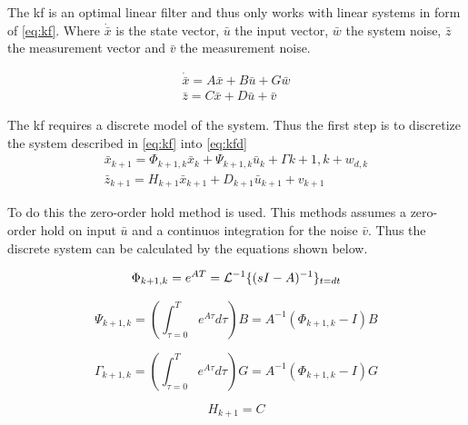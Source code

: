 The \gls{kf} is an optimal linear filter and thus only works with linear systems in form of \autoref{eq:kf}. Where $\dot{\bar x}$ is the state vector, $\bar u $ the input vector, $\bar w$ the system noise, $\bar z$ the measurement vector and $\bar v$ the measurement noise.

\begin{equation}
    \begin{array}{l}
        \dot {\bar x} = A\bar x + B\bar u + G\bar w\\
        \bar z = C\bar x + D\bar u + \bar v
    \end{array}
    \label{eq:kf}
\end{equation}

The \gls{kf} requires a discrete model of the system. Thus the first step is to discretize the system described in \autoref{eq:kf} into \autoref{eq:kfd}\\

\begin{equation}
    \begin{array}{l}
        {{\bar x}_{k + 1}} = {\Phi _{k + 1,k}}{{\bar x}_k} + {\Psi _{k + 1,k}}{{\bar u}_k} + {\Gamma {k + 1,    k}} + {w_{d,k}}\\
        {{\bar z}_{k + 1}} = {H_{k + 1}}{{\bar x}_{k + 1}} + {D_{k + 1}}{{\bar u}_{k + 1}} + {v_{k + 1}}
    \end{array}
    \label{eq:kfd}
\end{equation}

To do this the zero-order hold method is used. This methods assumes a zero-order hold on input $\bar u$ and a continuos integration for the noise $\bar v$. Thus the discrete system can be calculated by the equations shown below.

\begin{equation}
    {\Phi _{k + 1,k}} = {e^{AT}} = {{\cal L}^{ - 1}}{\{ {(sI - A)^{ - 1}}\} _{t = dt}}
\end{equation}

\begin{equation}
    {\Psi _{k + 1,k}} = \left( {\int_{\tau  = 0}^T {{e^{A\tau }}d\tau } } \right)B = {A^{ - 1}}({\Phi_
{k + 1,k}}-I)B
\end{equation}

\begin{equation}
    {\Gamma _{k + 1,k}} = \left( {\int_{\tau  = 0}^T {{e^{A\tau }}d\tau } } \right)G = {A^{ - 1}}({\Phi _{k + 1,k}}-I)G
\end{equation}

\begin{equation}
    {H_{k + 1}} = C
\end{equation}

